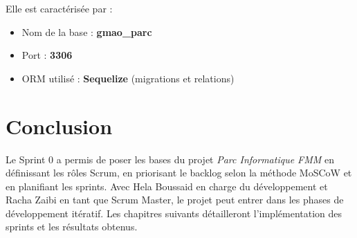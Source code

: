 Elle est caractérisée par :

\begin{itemize}
    \item Nom de la base : \textbf{gmao\_parc}
    \item Port : \textbf{3306}
    \item ORM utilisé : \textbf{Sequelize} (migrations et relations)
\end{itemize}

\section*{Conclusion}
\label{sec:conclusion_sprint0}

Le Sprint 0 a permis de poser les bases du projet \textit{Parc Informatique FMM} en définissant les rôles Scrum, en priorisant le backlog selon la méthode MoSCoW et en planifiant les sprints. Avec Hela Boussaid en charge du développement et Racha Zaibi en tant que Scrum Master, le projet peut entrer dans les phases de développement itératif. Les chapitres suivants détailleront l’implémentation des sprints et les résultats obtenus.



